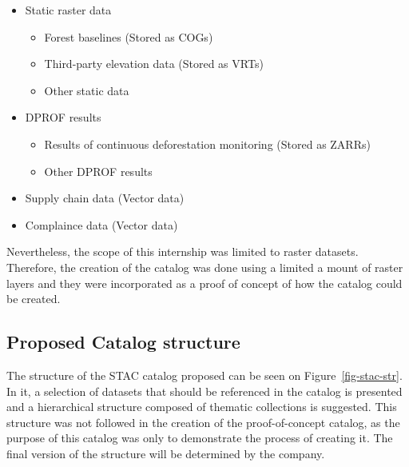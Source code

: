 \documentclass[
  oneside,
  open=any]{scrbook}
\providecommand{\tightlist}{%
  \setlength{\itemsep}{0pt}\setlength{\parskip}{0pt}}\usepackage{longtable,booktabs,array}
\begin{document}
\begin{itemize}
\tightlist
\item
  Static raster data

  \begin{itemize}
  \tightlist
  \item
    Forest baselines (Stored as COGs)
  \item
    Third-party elevation data (Stored as VRTs)
  \item
    Other static data
  \end{itemize}
\item
  DPROF results

  \begin{itemize}
  \tightlist
  \item
    Results of continuous deforestation monitoring (Stored as ZARRs)
  \item
    Other DPROF results
  \end{itemize}
\item
  Supply chain data (Vector data)
\item
  Complaince data (Vector data)
\end{itemize}

Nevertheless, the scope of this internship was limited to raster
datasets. Therefore, the creation of the catalog was done using a
limited a mount of raster layers and they were incorporated as a proof
of concept of how the catalog could be created.

\subsection{Proposed Catalog
structure}\label{proposed-catalog-structure}

The structure of the STAC catalog proposed can be seen on
Figure~\ref{fig-stac-str}. In it, a selection of datasets that should be
referenced in the catalog is presented and a hierarchical structure
composed of thematic collections is suggested. This structure was not
followed in the creation of the proof-of-concept catalog, as the purpose
of this catalog was only to demonstrate the process of creating it. The
final version of the structure will be determined by the company.
\end{document}
